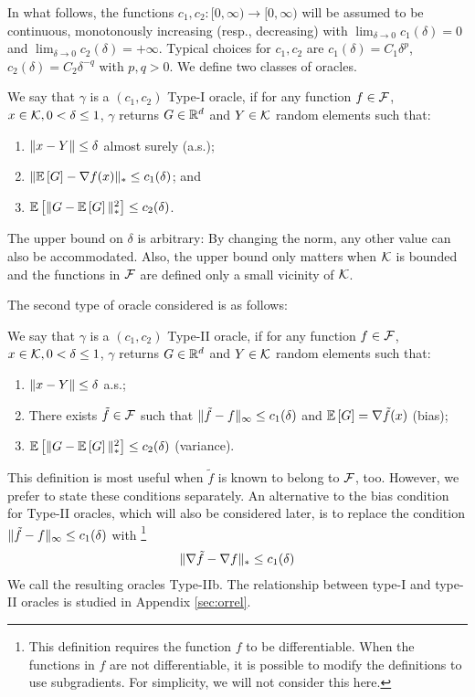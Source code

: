 In what follows, the functions $c_1,c_2:[0,\infty)\to [0,\infty)$ will be assumed to be continuous,
monotonously increasing (resp., decreasing) with
$\lim_{\delta\to  0} c_1(\delta)=0$ and $\lim_{\delta\to 0} c_2(\delta)=+\infty$.
Typical choices for $c_1,c_2$ are $c_1(\delta) = C_1 \delta^p$, $c_2(\delta) = C_2\delta^{-q}$ with $p,q>0$.
We define two classes of oracles. 
\begin{definition}
\label{def:oracle1}
We say that $\gamma$ is a  $(c_1,c_2)$ Type-I oracle, if for any function $f\in \mathcal{F}$,
$x\in \mathcal{K},0<\delta\le 1$, $\gamma$ returns $G\in \mathbb{R}^d$ and  $Y\in \mathcal{K}$ random elements such that:
\begin{enumerate}
\item $\|x-Y\|\le \delta$ almost surely (a.s.);
\item $\| \mathbb{E}\left[G\right]  - \nabla f(x)  \|_* \le c_1(\delta) $; and
\item $\mathbb{E}\left[\| G -  \mathbb{E}\left[G\right] \|_*^2\right] \le c_2(\delta)$.
\end{enumerate}
\end{definition}
The upper bound on $\delta$ is arbitrary: By changing the norm, any other value can also be accommodated. Also, the upper bound only matters when $\mathcal{K}$ is bounded and the functions in $\mathcal{F}$ are defined only a small vicinity of $\mathcal{K}$.

The second type of oracle considered is as follows:
\begin{definition}
\label{def:oracle2}
We say that $\gamma$ is a  $(c_1,c_2)$ Type-II oracle, if for any function $f\in \mathcal{F}$,
$x\in \mathcal{K},0<\delta\le 1$, $\gamma$ returns $G\in \mathbb{R}^d$ and  $Y\in \mathcal{K}$ random elements such that:
\begin{enumerate}
\item $\|x-Y\|\le \delta$ a.s.;
\item There exists $\tilde{f} \in \mathcal{F}$ such that
$\|\tilde{f}- f\|_\infty \le c_1(\delta)$  and
$\mathbb{E}\left[G\right]  = \nabla \tilde{f}(x)$ (bias);
\item $\mathbb{E}\left[\| G -  \mathbb{E}\left[G\right] \|_*^2\right] \le c_2(\delta)$ (variance).
\end{enumerate}
\end{definition}
This definition is most useful when $\tilde{f}$ is known to belong to $\mathcal{F}$, too.
However, we prefer to state these conditions separately.
An alternative to the bias condition for Type-II oracles, which will also be considered later, is to replace the condition $\|\tilde{f}-f\|_\infty \le c_1(\delta)$ with%
\footnote{
This definition requires the function $f$ to be differentiable. When the functions in $f$ are not differentiable, it is possible
to modify the definitions to use subgradients. For simplicity, we will not consider this here.
}
\begin{align}
\label{eq:oracle2alt}
\|\nabla \tilde{f}- \nabla f\|_* \le c_1(\delta)
\end{align}
We call the resulting oracles Type-IIb. The relationship between type-I and type-II oracles is studied in Appendix \ref{sec:orrel}.

